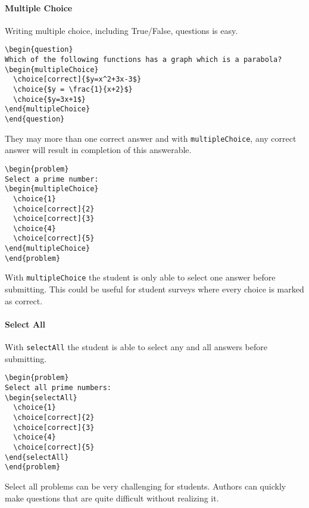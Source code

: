 \documentclass{ximera}
\begin{document}
\paragraph{Multiple Choice}
Writing multiple choice, including True/False, questions is easy.
\begin{verbatim}
\begin{question}
Which of the following functions has a graph which is a parabola?
\begin{multipleChoice}
  \choice[correct]{$y=x^2+3x-3$}
  \choice{$y = \frac{1}{x+2}$}
  \choice{$y=3x+1$}
\end{multipleChoice}
\end{question}
\end{verbatim}
They may more than one correct answer and with \verb!multipleChoice!, any
correct answer will result in completion of this answerable.
\begin{verbatim}
\begin{problem}
Select a prime number:
\begin{multipleChoice}
  \choice{1}
  \choice[correct]{2}
  \choice[correct]{3}
  \choice{4}
  \choice[correct]{5}
\end{multipleChoice}
\end{problem}
\end{verbatim}
With \verb!multipleChoice! the student is only able to select one answer before
submitting. This could be useful for student surveys where every choice is
marked as correct.

\paragraph{Select All}
With \verb!selectAll! the student is able to select any and all answers before
submitting.
\begin{verbatim}
\begin{problem}
Select all prime numbers:
\begin{selectAll}
  \choice{1}
  \choice[correct]{2}
  \choice[correct]{3}
  \choice{4}
  \choice[correct]{5}
\end{selectAll}
\end{problem}
\end{verbatim}
Select all problems can be very challenging for students. Authors can quickly
make
questions that are quite difficult without realizing it.
\end{document}
